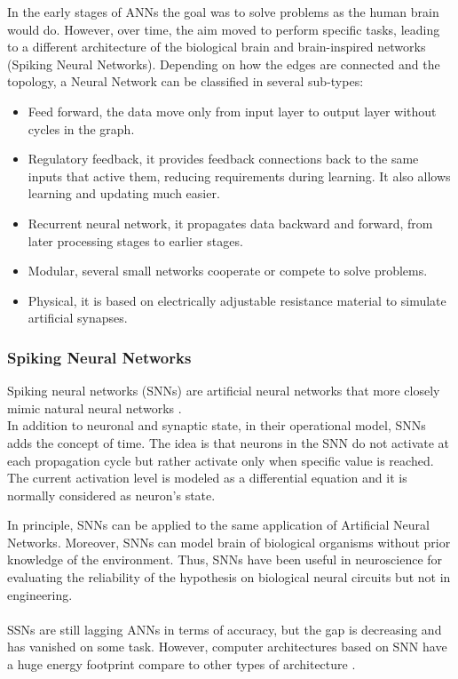 In the early stages of ANNs the goal was to solve problems as the human brain would do. However, over time, the aim moved to perform specific tasks, leading to a different architecture of the biological brain and brain-inspired networks (Spiking Neural Networks).
\newpage
Depending on how the edges are connected and the topology, a Neural Network can be classified in several sub-types:
\begin{itemize}
\item Feed forward, the data move only from input layer to output layer without cycles in the graph.
\item Regulatory feedback, it provides feedback connections back to the same inputs that active them, reducing requirements during learning. It also allows learning and updating much easier.
\item Recurrent neural network, it propagates data backward and forward, from later processing stages to earlier stages.
\item Modular, several small networks cooperate or compete to solve problems.
\item Physical, it is based on electrically adjustable resistance material to simulate artificial synapses.
\end{itemize}

\subsubsection{Spiking Neural Networks}
Spiking neural networks (SNNs) are artificial neural networks that more closely mimic natural neural networks \cite{article:1}. \\In addition to neuronal and synaptic state, in their operational model, SNNs adds the concept of time. The idea is that neurons in the SNN do not activate at each propagation cycle but rather activate only when specific value is reached.\\
The current activation level is modeled as a differential equation and it is normally considered as neuron's state.

In principle, SNNs can be applied to the same application of Artificial Neural Networks. Moreover, SNNs can model brain of biological organisms without prior knowledge of the environment. Thus, SNNs have been useful in neuroscience for evaluating the reliability of the hypothesis on biological neural circuits but not in engineering.\\\\
SSNs are still lagging ANNs in terms of accuracy, but the gap is decreasing and has vanished on some task\cite{article:2}. However, computer architectures based on SNN have a huge energy footprint compare to other types of architecture \cite{paper:44}.
\newpage
